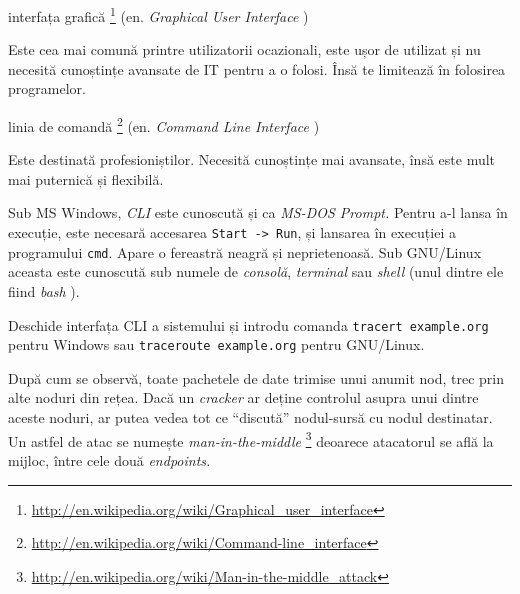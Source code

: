 \begin{itemize}

    \begin{item}
    interfața grafică
    \footnote{\url{http://en.wikipedia.org/wiki/Graphical_user_interface}}
    (en. \textsl{Graphical User Interface}
    )
    
    \begin{description}
    \item Este cea mai comună printre utilizatorii ocazionali, este ușor de
    utilizat și nu necesită cunoștințe avansate de IT pentru a o folosi.
    Însă te limitează în folosirea programelor.
    \end{description}
    \end{item}
    
    \begin{item}
    linia de comandă
    \footnote{\url{http://en.wikipedia.org/wiki/Command-line_interface}}
    (en. \textsl{Command Line Interface}
    )

    \begin{description}
    \item Este destinată profesioniștilor. Necesită
    cunoștințe mai avansate, însă este mult mai puternică și flexibilă.
    \end{description}
    \end{item}

\end{itemize}

Sub MS Windows, \textit{CLI} este cunoscută și ca \textsl{MS-DOS Prompt.}
Pentru a-l lansa în execuție, este necesară
accesarea \texttt{Start -> Run}, și lansarea în execuției a programului
\texttt{cmd}.  Apare o fereastră neagră și neprietenoasă. Sub GNU/Linux aceasta
este cunoscută sub numele de \textsl{consolă}, \textsl{terminal}
sau \textsl{shell}
(unul dintre ele fiind \textsl{bash}
).

Deschide interfața CLI a sistemului și introdu comanda \texttt{tracert
example.org} pentru Windows sau \texttt{traceroute example.org} pentru
GNU/Linux.

După cum se observă, toate pachetele de date trimise unui anumit nod, trec
prin alte noduri din rețea. Dacă un \textsl{cracker}
ar deține controlul asupra unui dintre aceste noduri, ar putea vedea tot ce
``discută'' nodul-sursă cu nodul destinatar. Un astfel de atac se numește
\textsl{man-in-the-middle}
    \footnote{\url{http://en.wikipedia.org/wiki/Man-in-the-middle_attack}}
deoarece atacatorul se află la mijloc, între cele două \textsl{endpoints.}


